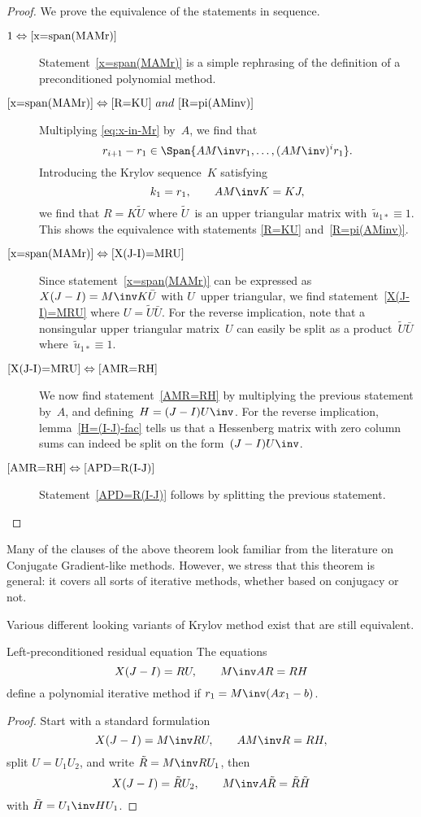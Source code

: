 \begin{proof}
We prove the equivalence of the statements in sequence.
\def\eqitem#1#2{\item[$#1\Leftrightarrow#2$]}
\begin{description}
%
\eqitem{1}{\ref{x=span(MAMr)}}
Statement~\ref{x=span(MAMr)} is a simple rephrasing of the definition of
a preconditioned polynomial method. 
%
\eqitem{\ref{x=span(MAMr)}}{\ref{R=KU}~and~\ref{R=pi(AMinv)}}
Multiplying \eqref{eq:x-in-Mr} by~$A$, we find that
        \[ r_{i+1}-r_1\in\Span
                {AM\inv  r_1,\ldots,(AM\inv )^i r_1}. \]
Introducing the Krylov sequence~$K$ satisfying
        \[ k_1=r_1,\qquad AM\inv K=KJ, \]
we find that $R=K\tilde U$ where $\tilde U$~is an upper triangular
matrix with~$\tilde u_{1*}\equiv1$. This shows the equivalence with
statements \ref{R=KU} and~\ref{R=pi(AMinv)}.
%
\eqitem{\ref{x=span(MAMr)}}{\ref{X(J-I)=MRU}}
Since statement~\ref{x=span(MAMr)} can be
expressed as~$X(J-I)=M\inv K\bar U$ with $U$~upper triangular, we find
statement~\ref{X(J-I)=MRU} where $U=\tilde U\bar U$. For the reverse
implication, note that a nonsingular upper triangular matrix~$U$ can
easily be split as a product~$\tilde U\bar U$ where~$\tilde
u_{1*}\equiv1$.
%
\eqitem{\ref{X(J-I)=MRU}}{\ref{AMR=RH}}
We now find statement~\ref{AMR=RH} by multiplying the previous
statement by~$A$, and defining~$H=(J-I)U\inv$. For the reverse
implication, lemma~\ref{H=(I-J)-fac} tells us that a Hessenberg matrix
with zero column sums can indeed be split on the
form~${(J-I)}\allowbreak U\inv$.
%
\eqitem{\ref{AMR=RH}}{\ref{APD=R(I-J)}}
Statement~\ref{APD=R(I-J)} follows by splitting the previous statement.
\end{description}
\end{proof}

Many of the clauses of the above theorem look familiar from the
literature on Conjugate Gradient-like methods. However, we stress that
this theorem is general: it covers all sorts of iterative methods,
whether based on conjugacy or not.

Various different looking variants of Krylov method exist that are
still equivalent.
\begin{ccorollary}{Left-preconditioned residual equation}
\label{left-gmres-basic}
The equations
\begin{equation}
     X(J-I)=RU,\qquad M\inv AR=RH
    \label{eq:MAR=RH}\end{equation}
define a polynomial iterative method if $r_1=M\inv(Ax_1-b)$.
\end{ccorollary}
\begin{proof}
Start with a standard formulation
\[ X(J-I)=M\inv RU,\qquad AM\inv R=RH, \]
split $U=U_1U_2$, and write $\tilde R=\nobreak M\inv RU_1$,
then \[ X(J-I)=\tilde RU_2,\qquad M\inv A\tilde R=\tilde R\tilde H \]
with $\tilde H=U_1\inv HU_1$.
\end{proof}


